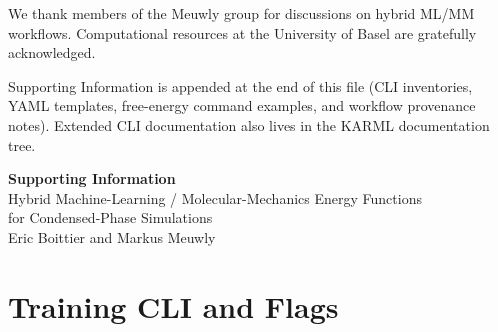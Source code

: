 \documentclass[journal=jctc,manuscript=article]{achemso}
\begin{document}
\begin{acknowledgement}
We thank members of the Meuwly group for discussions on hybrid ML/MM workflows.
Computational resources at the University of Basel are gratefully acknowledged.
\end{acknowledgement}

\begin{suppinfo}
Supporting Information is appended at the end of this file (CLI inventories,
YAML templates, free-energy command examples, and workflow provenance notes).
Extended CLI documentation also lives in the KARML documentation tree.
\end{suppinfo}

\clearpage
\setcounter{section}{0}
\setcounter{figure}{0}
\setcounter{table}{0}
\setcounter{equation}{0}
\renewcommand{\thesection}{S\arabic{section}}
\renewcommand{\thesubsection}{S\arabic{section}.\arabic{subsection}}
\renewcommand{\thefigure}{S\arabic{figure}}
\renewcommand{\thetable}{S\arabic{table}}
\renewcommand{\theequation}{S\arabic{equation}}

\begin{center}
{\LARGE\bfseries Supporting Information}\\[0.6em]
{\large Hybrid Machine-Learning / Molecular-Mechanics Energy Functions\\
for Condensed-Phase Simulations}\\[0.4em]
{\normalsize Eric Boittier and Markus Meuwly}
\end{center}
\vspace{1em}

\section{Training CLI and Flags}
\label{si:cli-train}
\end{document}
